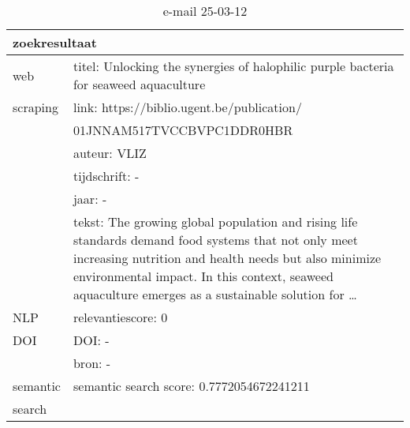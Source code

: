 \begin{table}[h!]
    \caption{e-mail 25-03-12}
    \centering
    \begin{tabularx}{\textwidth}{|p{4cm}|X|} 
        \hline
        \multicolumn{2}{|X|}{\textbf{zoekresultaat}} \\
        \hline
        web &titel: Unlocking the synergies of halophilic purple bacteria for seaweed aquaculture\\
        scraping&link: https://biblio.ugent.be/publication/\\&01JNNAM517TVCCBVPC1DDR0HBR\\
        &auteur: VLIZ\\
        &tijdschrift: -\\
        &jaar: -\\
        &tekst: The growing global population and rising life standards demand food systems that not only meet increasing nutrition and health needs but also minimize environmental impact. In this context, seaweed aquaculture emerges as a sustainable solution for …\\
        \hline
        NLP&relevantiescore: 0\\
        \hline
        DOI&DOI: -\\
        &bron: -\\
        \hline
        semantic&semantic search score: 0.7772054672241211\\
        search&\\
        \hline
    \end{tabularx}
    \label{table:email20250312}
\end{table}
